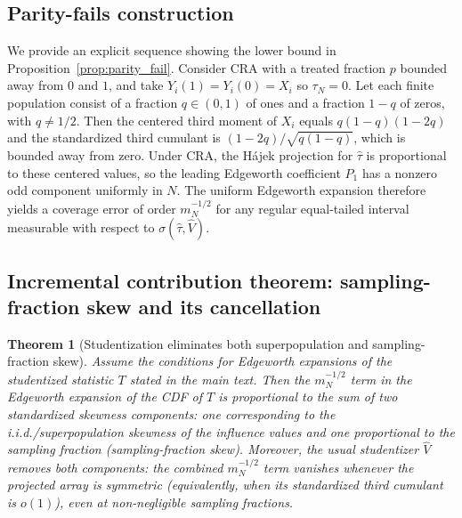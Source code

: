 \documentclass[aos]{imsart}
\newtheorem{theorem}{Theorem}
\theoremstyle{definition}
\theoremstyle{plain}
\newcommand{\mN}{m_N}
\begin{document}
\subsection{Parity-fails construction}\label{app:parity}

We provide an explicit sequence showing the lower bound in Proposition~\ref{prop:parity_fail}. Consider CRA with a treated
fraction $p$ bounded away from $0$ and $1$, and take $Y_i(1)=Y_i(0)=X_i$ so $\tau_N=0$. Let each finite population consist
of a fraction $q\in(0,1)$ of ones and a fraction $1-q$ of zeros, with $q\ne 1/2$. Then the centered third moment of $X_i$
equals $q(1-q)(1-2q)$ and the standardized third cumulant is $(1-2q)/\sqrt{q(1-q)}$, which is bounded away from zero.
Under CRA, the Hájek projection for $\hat\tau$ is proportional to these centered values, so the leading Edgeworth coefficient
$P_1$ has a nonzero odd component uniformly in $N$. The uniform Edgeworth expansion therefore yields a coverage error of
order $\mN^{-1/2}$ for any regular equal-tailed interval measurable with respect to $\sigma(\hat\tau,\hat V)$.

\subsection{Incremental contribution theorem: sampling-fraction skew and its cancellation}\label{app:incremental}

\begin{theorem}[Studentization eliminates both superpopulation and sampling-fraction skew]\label{thm:skew-both}
Assume the conditions for Edgeworth expansions of the studentized statistic $T$ stated in the main text.
Then the $m_N^{-1/2}$ term in the Edgeworth expansion of the CDF of $T$ is proportional to the sum of two standardized skewness components:
one corresponding to the i.i.d./superpopulation skewness of the influence values and one proportional to the sampling fraction (sampling-fraction skew).
Moreover, the usual studentizer $\hat V$ removes \emph{both} components: the combined $m_N^{-1/2}$ term vanishes whenever the projected array is symmetric
(equivalently, when its standardized third cumulant is $o(1)$), even at non-negligible sampling fractions.
\end{theorem}
\end{document}
